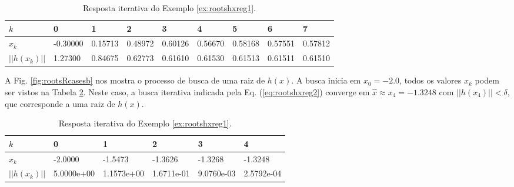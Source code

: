 \begin{table}[!h]
\centering
\begin{tabular}{|l|l|l|l|l|l|l|l|l|}
\hline
$k$      & 0 & 1 & 2 & 3 & 4 & 5 & 6 & 7\\ \hline
$x_k$    & -0.30000 & 0.15713 & 0.48972 & 0.60126 & 0.56670 & 0.58168 & 0.57551 & 0.57812 \\ \hline
$||h(x_k)||$ & 1.27300  & 0.84675 & 0.62773 & 0.61610 & 0.61530 & 0.61513 & 0.61511 & 0.61510 \\ \hline
\end{tabular}
\caption{Resposta iterativa do Exemplo \ref{ex:rootshxreg1}.}
\label{tab:rootsRcases1}
\end{table}

\begin{SolutionT}\label{sol:rootshxreg2}
A Fig. \ref{fig:rootsRcasesb} nos mostra o processo de busca de uma raiz de $h(x)$. 
A busca inicia em $x_0=-2.0$,
 todos os valores $x_{k}$ podem ser vistos na Tabela \ref{tab:rootsRcases2}. 
Neste caso, a busca iterativa indicada pela Eq. (\ref{eq:rootshxreg2}) converge 
em $\hat{x}\approx x_4 = -1.3248$ com $||h(x_4)||<\delta$, que corresponde a uma raiz de $h(x)$.
\end{SolutionT}

\begin{table}[!h]
\centering
\begin{tabular}{|l|l|l|l|l|l|}
\hline
$k$      & 0 & 1 & 2 & 3 & 4 \\ \hline
$x_k$    & -2.0000 & -1.5473 & -1.3626 & -1.3268 & -1.3248 \\ \hline
$||h(x_k)||$ & 5.0000e+00 & 1.1573e+00 & 1.6711e-01 & 9.0760e-03 & 2.5792e-04 \\ \hline
\end{tabular}
\caption{Resposta iterativa do Exemplo \ref{ex:rootshxreg1}.}
\label{tab:rootsRcases2}
\end{table}

